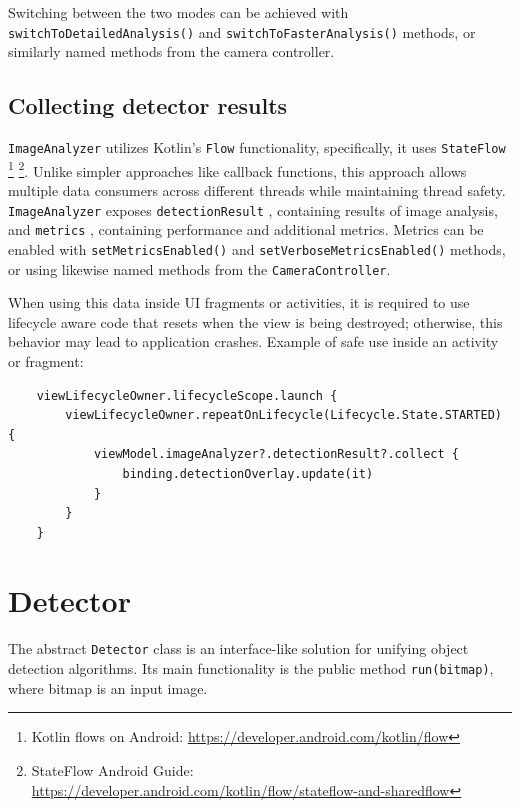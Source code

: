 Switching between the two modes can be achieved with \texttt{switchToDetailedAnalysis()} and \texttt{switchToFasterAnalysis()} methods, or similarly named methods from the camera controller.

\subsection{Collecting detector results}
\texttt{ImageAnalyzer} utilizes Kotlin's \texttt{Flow} functionality, specifically, it uses \texttt{StateFlow} \footnote{Kotlin flows on Android: \url{https://developer.android.com/kotlin/flow}} \footnote{StateFlow Android Guide: \url{https://developer.android.com/kotlin/flow/stateflow-and-sharedflow}}. Unlike simpler approaches like callback functions, this approach allows multiple data consumers across different threads while maintaining thread safety. \texttt{ImageAnalyzer} exposes \texttt{detectionResult} , containing results of image analysis, and \texttt{metrics} , containing performance and additional metrics. Metrics can be enabled with \texttt{setMetricsEnabled()} and \texttt{setVerboseMetricsEnabled()} methods, or using likewise named methods from the \texttt{CameraController}.

When using this data inside UI fragments or activities, it is required to use lifecycle aware code that resets when the view is being destroyed; otherwise, this behavior may lead to application crashes. Example of safe use inside an activity or fragment:

\begin{verbatim}
    viewLifecycleOwner.lifecycleScope.launch {
        viewLifecycleOwner.repeatOnLifecycle(Lifecycle.State.STARTED) {
            viewModel.imageAnalyzer?.detectionResult?.collect {
                binding.detectionOverlay.update(it)
            }
        }
    }
\end{verbatim}




\section{Detector}
\label{Detector}
The abstract \texttt{Detector} class is an interface-like solution for unifying object detection algorithms. Its main functionality is the public method \texttt{run(bitmap)}, where bitmap is an input image.

